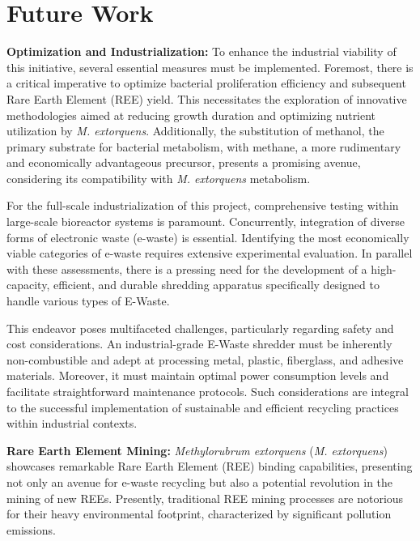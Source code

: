 \chapter{Future Work\authorB{}}

\textbf{Optimization and Industrialization:}
To enhance the industrial viability of this initiative, several essential measures must be implemented.
Foremost, there is a critical imperative to optimize bacterial proliferation efficiency and subsequent
Rare Earth Element (REE) yield. This necessitates the exploration of innovative methodologies aimed
at reducing growth duration and optimizing nutrient utilization by \emph{M. extorquens}.
Additionally, the substitution of methanol, the primary substrate for bacterial metabolism, with
methane, a more rudimentary and economically advantageous precursor, presents a promising
avenue, considering its compatibility with \emph{M. extorquens} metabolism.

For the full-scale industrialization of this project, comprehensive testing within large-scale bioreactor
systems is paramount. Concurrently, integration of diverse forms of electronic waste (e-waste) is
essential. Identifying the most economically viable categories of e-waste requires extensive
experimental evaluation. In parallel with these assessments, there is a pressing need for the
development of a high-capacity, efficient, and durable shredding apparatus specifically designed to
handle various types of E-Waste.

This endeavor poses multifaceted challenges, particularly regarding safety and cost considerations.
An industrial-grade E-Waste shredder must be inherently non-combustible and adept at processing
metal, plastic, fiberglass, and adhesive materials. Moreover, it must maintain optimal power
consumption levels and facilitate straightforward maintenance protocols. Such considerations are
integral to the successful implementation of sustainable and efficient recycling practices within
industrial contexts.

\textbf{Rare Earth Element Mining:}
\emph{Methylorubrum extorquens} (\emph{M. extorquens}) showcases remarkable Rare Earth Element (REE)
binding capabilities, presenting not only an avenue for e-waste recycling but also a potential
revolution in the mining of new REEs. Presently, traditional REE mining processes are notorious for
their heavy environmental footprint, characterized by significant pollution emissions.

